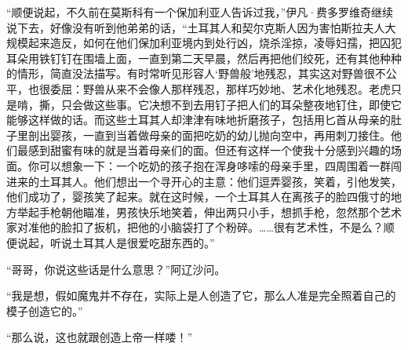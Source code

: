 \par “顺便说起，不久前在莫斯科有一个保加利亚人告诉过我，”伊凡·费多罗维奇继续说下去，好像没有听到他弟弟的话，“土耳其人和契尔克斯人因为害怕斯拉夫人大规模起来造反，如何在他们保加利亚境内到处行凶，烧杀淫掠，凌辱妇孺，把囚犯耳朵用铁钉钉在围墙上面，一直到第二天早晨，然后再把他们绞死，还有其他种种的情形，简直没法描写。有时常听见形容人‘野兽般’地残忍，其实这对野兽很不公平，也很委屈：野兽从来不会像人那样残忍，那样巧妙地、艺术化地残忍。老虎只是啃，撕，只会做这些事。它决想不到去用钉子把人们的耳朵整夜地钉住，即使它能够这样做的话。而这些土耳其人却津津有味地折磨孩子，包括用匕首从母亲的肚子里剖出婴孩，一直到当着做母亲的面把吃奶的幼儿抛向空中，再用刺刀接住。他们最感到甜蜜有味的就是当着母亲们的面。但还有这样一个使我十分感到兴趣的场面。你可以想象一下：一个吃奶的孩子抱在浑身哆嗦的母亲手里，四周围着一群闯进来的土耳其人。他们想出一个寻开心的主意：他们逗弄婴孩，笑着，引他发笑，他们成功了，婴孩笑了起来。就在这时候，一个土耳其人在离孩子的脸四俄寸的地方举起手枪朝他瞄准，男孩快乐地笑着，伸出两只小手，想抓手枪，忽然那个艺术家对准他的脸扣了扳机，把他的小脑袋打了个粉碎。……很有艺术性，不是么？顺便说起，听说土耳其人是很爱吃甜东西的。”
\par “哥哥，你说这些话是什么意思？”阿辽沙问。
\par “我是想，假如魔鬼并不存在，实际上是人创造了它，那么人准是完全照着自己的模子创造它的。”
\par “那么说，这也就跟创造上帝一样喽！”
